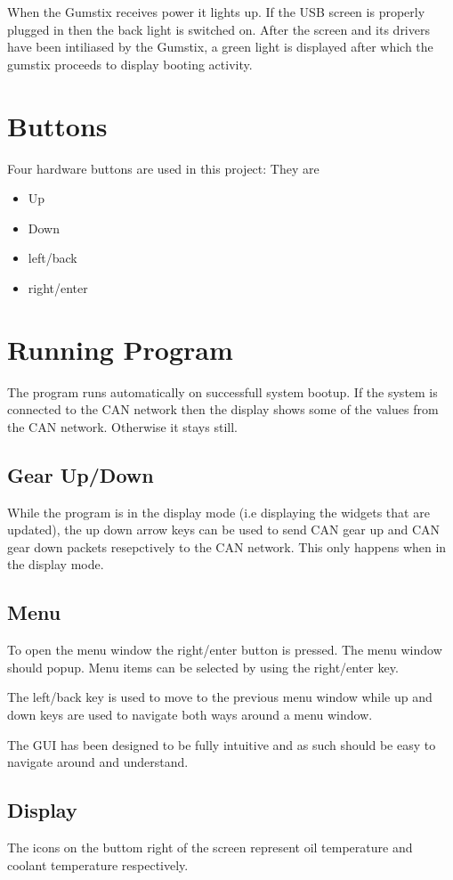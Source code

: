 \documentclass[11pt]{report} %
\begin{document}
When the Gumstix receives power it lights up. If the USB screen is properly plugged in
then the back light is switched on. After the screen and its drivers have been intiliased by the Gumstix,
a green light is displayed after which the gumstix proceeds to display booting activity.

\section{Buttons}
Four hardware buttons are used in this project: They are
\begin{itemize}
\item Up
\item Down
\item left/back
\item right/enter
\end{itemize}

\section {Running Program}
The program runs automatically on successfull system bootup. If the system is connected to the CAN network
then the display shows some of the values from the CAN network. Otherwise it stays still.

\subsection{Gear Up/Down}
While the program is in the display mode (i.e displaying the widgets that are updated), the up down arrow keys
can be used to send CAN gear up and CAN gear down packets resepctively to the CAN network. This only happens when 
in the display mode.


\subsection{Menu}
To open the menu window the right/enter button is pressed. The menu window should popup. Menu items can be selected
by using the right/enter key.

The left/back key is used to move to the previous menu window while up and down keys are used to navigate both ways around a menu window.

The GUI has been designed to be fully intuitive and as such should be easy to navigate around and understand.		
	
\subsection {Display}	
	The icons on the buttom right of the screen represent oil temperature and coolant temperature respectively.
\end{document}
